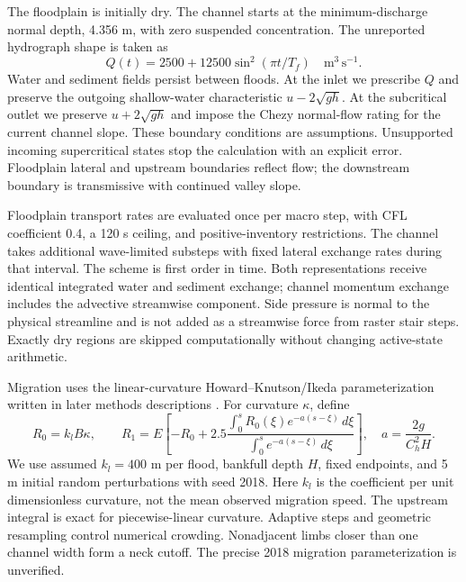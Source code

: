 The floodplain is initially dry. The channel starts at the minimum-discharge
normal depth, 4.356 m, with zero suspended concentration. The unreported
hydrograph shape is taken as
\begin{equation}
 Q(t)=2500+12500\sin^2(\pi t/T_f)\quad\mathrm{m^3\,s^{-1}}.
\end{equation}
Water and sediment fields persist between floods. At the inlet we prescribe
$Q$ and preserve the outgoing shallow-water characteristic
$u-2\sqrt{gh}$. At the subcritical outlet we preserve $u+2\sqrt{gh}$ and
impose the Chezy normal-flow rating for the current channel slope.
These boundary conditions are assumptions. Unsupported incoming
supercritical states stop the calculation with an explicit error.
Floodplain lateral and upstream boundaries reflect flow; the downstream
boundary is transmissive with continued valley slope.

Floodplain transport rates are evaluated once per macro step, with CFL
coefficient 0.4, a 120 s ceiling, and positive-inventory restrictions.
The channel takes additional wave-limited substeps with fixed lateral
exchange rates during that interval. The scheme is first order in time.
Both representations receive identical integrated water and sediment
exchange; channel momentum exchange includes the advective streamwise
component. Side pressure is normal to the physical streamline and is not
added as a streamwise force from raster stair steps. Exactly dry regions
are skipped computationally without changing active-state arithmetic.

Migration uses the linear-curvature Howard--Knutson/Ikeda parameterization
written in later methods descriptions \cite{schwendel2015,limaye2014}. For curvature $\kappa$, define
\begin{equation}
 R_0=k_l B\kappa,\qquad
 R_1=E\left[-R_0+2.5\frac{\int_0^s R_0(\xi)
 e^{-a(s-\xi)}\,d\xi}{\int_0^s e^{-a(s-\xi)}\,d\xi}\right],
 \quad a=\frac{2g}{C_h^2 H}.
\end{equation}
We use assumed $k_l=400$ m per flood, bankfull depth $H$, fixed endpoints,
and 5 m initial random perturbations with seed 2018. Here $k_l$ is the
coefficient per unit dimensionless curvature, not the mean observed
migration speed. The upstream integral is exact for piecewise-linear
curvature. Adaptive steps and geometric resampling control numerical
crowding. Nonadjacent limbs closer than one channel width form a neck
cutoff. The precise 2018 migration parameterization is unverified.

